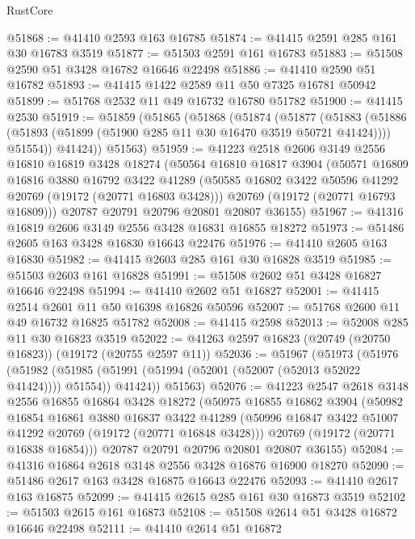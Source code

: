 \begin{lexlean}{RustCore}
\begin{coremodule}
@51868 := @41410 @2593 @163 @16785
@51874 := @41415 @2591 @285 @161 @30 @16783 @3519
@51877 := @51503 @2591 @161 @16783
@51883 := @51508 @2590 @51 @3428 @16782 @16646 @22498
@51886 := @41410 @2590 @51 @16782
@51893 := @41415 @1422 @2589 @11 @50 @7325 @16781 @50942
@51899 := @51768 @2532 @11 @49 @16732 @16780 @51782
@51900 := @41415 @2530
@51919 := @51859
    (@51865
      (@51868
        (@51874
          (@51877
            (@51883
              (@51886 (@51893 (@51899 (@51900 @285 @11 @30 @16470 @3519 @50721 @41424))))
              @51554))
          @41424))
      @51563)
@51959 := @41223
    @2518
    @2606
    @3149
    @2556
    @16810
    @16819
    @3428
    @18274
    (@50564
      @16810
      @16817
      @3904
      (@50571
        @16809
        @16816
        @3880
        @16792
        @3422
        @41289
        (@50585 @16802 @3422 @50596 @41292 @20769 (@19172 (@20771 @16803 @3428)))
        @20769
        (@19172 (@20771 @16793 @16809)))
      @20787
      @20791
      @20796
      @20801
      @20807
      @36155)
@51967 := @41316 @16819 @2606 @3149 @2556 @3428 @16831 @16855 @18272
@51973 := @51486 @2605 @163 @3428 @16830 @16643 @22476
@51976 := @41410 @2605 @163 @16830
@51982 := @41415 @2603 @285 @161 @30 @16828 @3519
@51985 := @51503 @2603 @161 @16828
@51991 := @51508 @2602 @51 @3428 @16827 @16646 @22498
@51994 := @41410 @2602 @51 @16827
@52001 := @41415 @2514 @2601 @11 @50 @16398 @16826 @50596
@52007 := @51768 @2600 @11 @49 @16732 @16825 @51782
@52008 := @41415 @2598
@52013 := @52008 @285 @11 @30 @16823 @3519
@52022 := @41263 @2597 @16823 (@20749 (@20750 @16823)) (@19172 (@20755 @2597 @11))
@52036 := @51967
    (@51973
      (@51976
        (@51982 (@51985 (@51991 (@51994 (@52001 (@52007 (@52013 @52022 @41424)))) @51554)) @41424))
      @51563)
@52076 := @41223
    @2547
    @2618
    @3148
    @2556
    @16855
    @16864
    @3428
    @18272
    (@50975
      @16855
      @16862
      @3904
      (@50982
        @16854
        @16861
        @3880
        @16837
        @3422
        @41289
        (@50996 @16847 @3422 @51007 @41292 @20769 (@19172 (@20771 @16848 @3428)))
        @20769
        (@19172 (@20771 @16838 @16854)))
      @20787
      @20791
      @20796
      @20801
      @20807
      @36155)
@52084 := @41316 @16864 @2618 @3148 @2556 @3428 @16876 @16900 @18270
@52090 := @51486 @2617 @163 @3428 @16875 @16643 @22476
@52093 := @41410 @2617 @163 @16875
@52099 := @41415 @2615 @285 @161 @30 @16873 @3519
@52102 := @51503 @2615 @161 @16873
@52108 := @51508 @2614 @51 @3428 @16872 @16646 @22498
@52111 := @41410 @2614 @51 @16872

\end{coremodule}
\end{lexlean}
